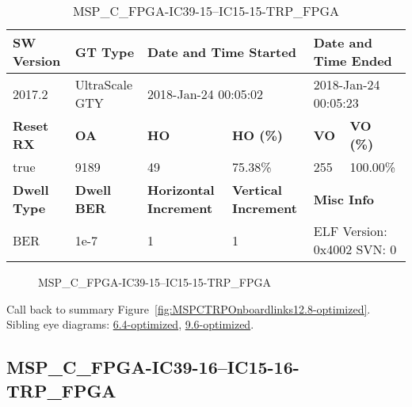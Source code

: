 \begin{table}[h]
\centering
\caption{MSP\_C\_FPGA-IC39-15--IC15-15-TRP\_FPGA}
\label{tab:MSPCFPGAIC3915IC1515TRPFPGA12.8-optimized}
\begin{tabular}{@{}|l|l|l|l|l|l|@{}}
\toprule
\textbf{SW Version}                & \textbf{GT Type}   & \multicolumn{2}{l|}{\textbf{Date and Time Started}}            & \multicolumn{2}{l|}{\textbf{Date and Time Ended}}        \\ \midrule
2017.2                       & UltraScale GTY          & \multicolumn{2}{l|}{2018-Jan-24 00:05:02}                   & \multicolumn{2}{l|}{2018-Jan-24 00:05:23}               \\ \midrule
\textbf{Reset RX}                  & \textbf{OA} & \textbf{HO}   & \textbf{HO (\%)} & \textbf{VO} & \textbf{VO (\%)} \\ \midrule
true & 9189        & 49          & 75.38\%        & 255        & 100.00\%       \\ \midrule
\textbf{Dwell Type}                & \textbf{Dwell BER} & \textbf{Horizontal Increment} & \textbf{Vertical Increment}    & \multicolumn{2}{l|}{\textbf{Misc Info}}                  \\ \midrule
BER                            & 1e-7        & 1        & 1           & \multicolumn{2}{l|}{ELF Version: 0x4002 SVN: 0}                         \\ \bottomrule
\end{tabular}
\end{table}

\begin{figure}[h]
\caption{MSP\_C\_FPGA-IC39-15--IC15-15-TRP\_FPGA} \label{fig:MSPCFPGAIC3915IC1515TRPFPGA12.8-optimized}
\end{figure}

Call back to summary Figure~\ref{fig:MSPCTRPOnboardlinks12.8-optimized}.
Sibling eye diagrams: \hyperref[sec:MSPCFPGAIC3915IC1515TRPFPGA6.4-optimized]{6.4-optimized}, \hyperref[sec:MSPCFPGAIC3915IC1515TRPFPGA9.6-optimized]{9.6-optimized}.

\clearpage
\newpage


\subsection{MSP\_C\_FPGA-IC39-16--IC15-16-TRP\_FPGA}\label{sec:MSPCFPGAIC3916IC1516TRPFPGA12.8-optimized}

